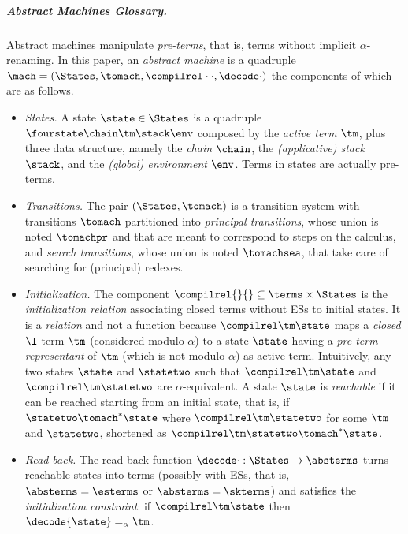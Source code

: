 \subparagraph{Abstract Machines Glossary.}  Abstract machines manipulate \emph{pre-terms}, that is, terms without implicit $\alpha$-renaming. In this paper, an \emph{abstract 
machine} is a quadruple $\mach = (\States, \tomach, \compilrel\cdot\cdot, \decode\cdot)$ the components of which are as follows.
\begin{itemize}

\item \emph{States.} A state $\state\in\States$ is a quadruple $\fourstate\chain\tm\stack\env$ composed by the \emph{active term} $\tm$, plus three data structure, namely the \emph{chain} $\chain$, the \emph{(applicative) stack} $\stack$, and the \emph{(global) environment} $\env$. Terms in states are actually pre-terms.

\item  \emph{Transitions.} The pair $(\States, \tomach)$ is a transition 
system with transitions $\tomach$ partitioned into \emph{principal transitions}, whose union is noted $\tomachpr$ and that are meant to correspond to steps on the calculus, and \emph{search transitions}, whose union is noted $\tomachsea$, that take care of searching for (principal) redexes.

\item \emph{Initialization.} The component $\compilrel{}{}\subseteq\terms\times\States$ is the \emph{initialization relation} associating closed terms without ESs to 
initial states. It is a \emph{relation} and not a function because $\compilrel\tm\state$ maps a \emph{closed} $\l$-term $\tm$ (considered modulo $\alpha$) to a state $\state$ having a \emph{pre-term representant} of $\tm$ (which is not modulo $\alpha$) as active term. Intuitively, any two states $\state$ and $\statetwo$ such that $\compilrel\tm\state$ and $\compilrel\tm\statetwo$ are $\alpha$-equivalent. 
A state $\state$ is \emph{reachable} if it can be reached starting from an initial state, that is, if $\statetwo \tomach^*\state$ where $\compilrel\tm\statetwo$ for some $\tm$ and $\statetwo$, shortened as $\compilrel\tm\statetwo \tomach^*\state$.

\item \emph{Read-back.} The read-back function $\decode\cdot:\States\to\absterms$ turns reachable states into 
terms (possibly with ESs, that is, $\absterms = \esterms$ or $\absterms = \skterms$) and satisfies the \emph{initialization constraint}: if $\compilrel\tm\state$ then $\decode{\state}=_\alpha\tm$.
\end{itemize}

